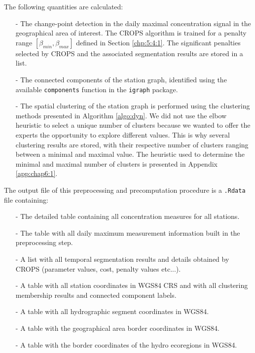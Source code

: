 The following quantities are calculated:
\begin{itemize}
\item[-] The change-point detection in the daily maximal concentration signal in the geographical area of interest. The CROPS algorithm is trained for a penalty range $[\beta_{min},\beta_{max}]$ defined in Section \ref{chp:5:4:1}. The significant penalties selected by CROPS and the associated segmentation results are stored in a list.
\item[-] The connected components of the station graph, identified using the available \texttt{components} function in the \texttt{igraph} package.
\item[-] The spatial clustering of the station graph is performed using the clustering methods presented in Algorithm \ref{algo:dyn}. We did not use the elbow heuristic to select a unique number of clusters because we wanted to offer the experts the opportunity to explore different values. This is why several clustering results are stored, with their respective number of clusters ranging between a minimal and maximal value. The heuristic used to determine the minimal and maximal number of clusters is presented in Appendix \ref{app:chap6:1}.  
\end{itemize}

The output file of this preprocessing and precomputation procedure is a \texttt{.Rdata} file containing: 
\begin{itemize}
\item[-] The detailed table containing all concentration measures for all stations.
\item[-] The table with all daily maximum measurement information built in the preprocessing step.
\item[-] A list with all temporal segmentation results and details obtained by CROPS (parameter values, cost, penalty values etc...).
\item[-] A table with all station coordinates in WGS84 CRS and with all clustering membership results and connected component labels. 
\item[-] A table with all hydrographic segment coordinates in WGS84. 
\item[-] A table with the geographical area border coordinates in WGS84.
\item[-] A table with the border coordinates of the hydro ecoregions in WGS84.
\end{itemize}

